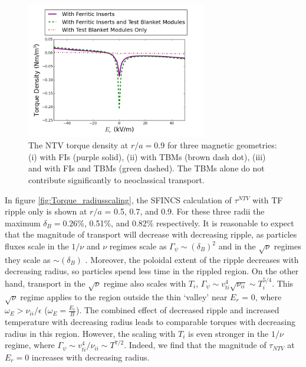 \documentclass{article}
\numberwithin{figure}{section}
\numberwithin{equation}{section}
\begin{document}
\begin{figure}[h!]
\centering
\includegraphics[width=0.7\textwidth]{Torque_comparingTBMandFI.png}
\caption{\label{fig:Torque_comparingTBMandFI} The NTV torque density at $r/a = 0.9$ for three magnetic geometries: (i) with FIs (purple solid), (ii) with TBMs (brown dash dot), (iii) and with FIs and TBMs (green dashed). The TBMs alone do not contribute significantly to neoclassical transport. }
\end{figure}

In figure \ref{fig:Torque_radiusscaling}, the SFINCS calculation of $\tau^{NTV}$ with TF ripple only is shown at $r/a$ = 0.5, 0.7, and 0.9. For these three radii the maximum $\delta_B = 0.26\%$, 0.51\%, and 0.82\% respectively. It is reasonable to expect that the magnitude of transport will decrease with decreasing ripple, as particles fluxes scale in the $1/\nu$ and $\nu$ regimes scale as $\Gamma_{\psi} \sim (\delta_B)^2$ and in the $\sqrt{\nu}$ regimes they scale as $\sim (\delta_B)$ \cite{Shaing2010}.  Moreover, the poloidal extent of the ripple decreases with decreasing radius, so particles spend less time in the rippled region. On the other hand, transport in the $\sqrt{\nu}$ regime also scales with $T_i$, $\Gamma_{\psi} \sim v_{ti}^4 \sqrt{\nu_{ii}} \sim T_i^{5/4}$. This $\sqrt{\nu}$ regime applies to the region outside the thin `valley' near $E_r$ = 0, where $\omega_E > \nu_{ii}/\epsilon$ ($\omega_E = \frac{E_r}{B}$). The combined effect of decreased ripple and increased temperature with decreasing radius leads to comparable torques with decreasing radius in this region. However, the scaling with $T_i$ is even stronger in the $1/\nu$ regime, where $\Gamma_{\psi} \sim v_{ti}^4/\nu_{ii} \sim T^{7/2}$. Indeed, we find that the magnitude of $\tau_{NTV}$ at $E_r = 0$ increases with decreasing radius. 
\end{document}
